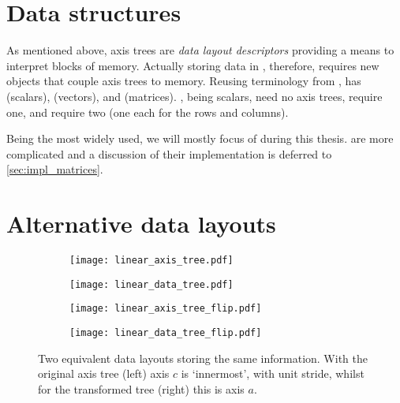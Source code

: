\documentclass[thesis]{subfiles}
\begin{document}
\section{Data structures}

As mentioned above, axis trees are \emph{data layout descriptors} providing a means to interpret blocks of memory.
Actually storing data in , therefore, requires new objects that couple axis trees to memory.
Reusing terminology from ,  has  (scalars),  (vectors), and  (matrices).
, being scalars, need no axis trees,  require one, and  require two (one each for the rows and columns).

Being the most widely used, we will mostly focus of  during this thesis.
 are more complicated and a discussion of their implementation is deferred to \cref{sec:impl_matrices}.

\section{Alternative data layouts}
\label{sec:axis_tree_alternative_layouts}

\begin{figure}
  \centering
  \begin{subfigure}{.45\textwidth}
    \centering
    \begin{minipage}{.3\textwidth}
      \begin{center}
        \texttt{[image: linear\_axis\_tree.pdf]}
      \end{center}
    \end{minipage}
    \begin{minipage}{.6\textwidth}
      \begin{center}
        \texttt{[image: linear\_data\_tree.pdf]}
      \end{center}
    \end{minipage}
  \end{subfigure}
  \hspace{1em}
  \begin{subfigure}{.45\textwidth}
    \centering
    \begin{minipage}{.3\textwidth}
      \begin{center}
        \texttt{[image: linear\_axis\_tree\_flip.pdf]}
      \end{center}
    \end{minipage}
    \begin{minipage}{.6\textwidth}
      \begin{center}
        \texttt{[image: linear\_data\_tree\_flip.pdf]}
      \end{center}
    \end{minipage}
  \end{subfigure}

  \caption{
    Two equivalent data layouts storing the same information.
    With the original axis tree (left) axis $c$ is `innermost', with unit stride, whilst for the transformed tree (right) this is axis $a$.
  }
  \label{fig:linear_axis_tree_flip}
\end{figure}
\end{document}
